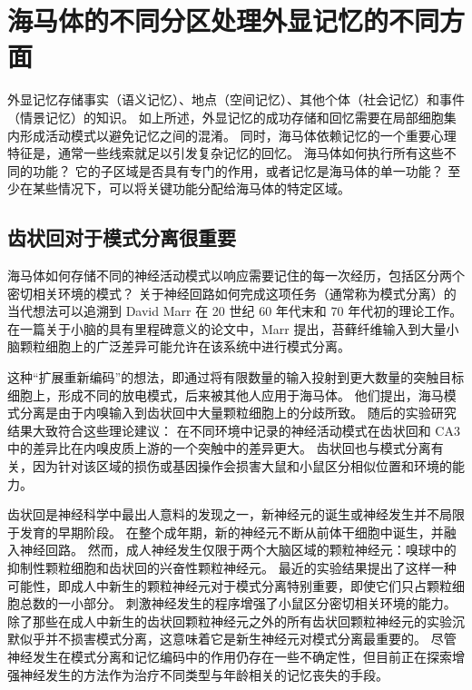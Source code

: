 \section{海马体的不同分区处理外显记忆的不同方面}

外显记忆存储事实（语义记忆）、地点（空间记忆）、其他个体（社会记忆）和事件（情景记忆）的知识。
如上所述，外显记忆的成功存储和回忆需要在局部细胞集内形成活动模式以避免记忆之间的混淆。
同时，海马体依赖记忆的一个重要心理特征是，通常一些线索就足以引发复杂记忆的回忆。
海马体如何执行所有这些不同的功能？
它的子区域是否具有专门的作用，或者记忆是海马体的单一功能？
至少在某些情况下，可以将关键功能分配给海马体的特定区域。



\subsection{齿状回对于模式分离很重要}

海马体如何存储不同的神经活动模式以响应需要记住的每一次经历，包括区分两个密切相关环境的模式？
关于神经回路如何完成这项任务（通常称为模式分离）的当代想法可以追溯到 David Marr 在 20 世纪 60 年代末和 70 年代初的理论工作。
在一篇关于小脑的具有里程碑意义的论文中，Marr 提出，苔藓纤维输入到大量小脑颗粒细胞上的广泛差异可能允许在该系统中进行模式分离。


这种“扩展重新编码”的想法，即通过将有限数量的输入投射到更大数量的突触目标细胞上，形成不同的放电模式，后来被其他人应用于海马体。
他们提出，海马模式分离是由于内嗅输入到齿状回中大量颗粒细胞上的分歧所致。 随后的实验研究结果大致符合这些理论建议：
在不同环境中记录的神经活动模式在齿状回和 CA3 中的差异比在内嗅皮质上游的一个突触中的差异更大。
齿状回也与模式分离有关，因为针对该区域的损伤或基因操作会损害大鼠和小鼠区分相似位置和环境的能力。


齿状回是神经科学中最出人意料的发现之一，新神经元的诞生或神经发生并不局限于发育的早期阶段。
在整个成年期，新的神经元不断从前体干细胞中诞生，并融入神经回路。
然而，成人神经发生仅限于两个大脑区域的颗粒神经元：嗅球中的抑制性颗粒细胞和齿状回的兴奋性颗粒神经元。 最近的实验结果提出了这样一种可能性，即成人中新生的颗粒神经元对于模式分离特别重要，即使它们只占颗粒细胞总数的一小部分。
刺激神经发生的程序增强了小鼠区分密切相关环境的能力。
除了那些在成人中新生的齿状回颗粒神经元之外的所有齿状回颗粒神经元的实验沉默似乎并不损害模式分离，这意味着它是新生神经元对模式分离最重要的。
尽管神经发生在模式分离和记忆编码中的作用仍存在一些不确定性，但目前正在探索增强神经发生的方法作为治疗不同类型与年龄相关的记忆丧失的手段。



